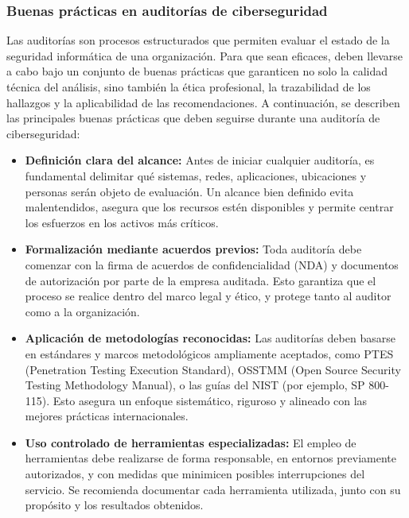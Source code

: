 \documentclass[a4paper, 10pt]{article}
\begin{document}
    \subsubsection{Buenas prácticas en auditorías de ciberseguridad}

    Las auditorías son procesos estructurados que permiten evaluar el estado de la seguridad informática de una organización. 
    Para que sean eficaces, deben llevarse a cabo bajo un conjunto de buenas prácticas que garanticen no solo la calidad técnica del análisis, sino también la ética profesional, 
    la trazabilidad de los hallazgos y la aplicabilidad de las recomendaciones. A continuación, se describen las principales buenas prácticas que deben seguirse durante una auditoría de ciberseguridad:
    
    \begin{itemize}
    
        \item \textbf{Definición clara del alcance:}  
        Antes de iniciar cualquier auditoría, es fundamental delimitar qué sistemas, redes, aplicaciones, ubicaciones y personas serán objeto de evaluación. Un alcance bien definido evita malentendidos, asegura que los recursos estén disponibles y permite centrar los esfuerzos en los activos más críticos.
    
        \item \textbf{Formalización mediante acuerdos previos:}  
        Toda auditoría debe comenzar con la firma de acuerdos de confidencialidad (NDA) y documentos de autorización por parte de la empresa auditada. Esto garantiza que el proceso se realice dentro del marco legal y ético, y protege tanto al auditor como a la organización.
    
        \item \textbf{Aplicación de metodologías reconocidas:}  
        Las auditorías deben basarse en estándares y marcos metodológicos ampliamente aceptados, como PTES (Penetration Testing Execution Standard), OSSTMM (Open Source Security Testing Methodology Manual), o las guías del NIST (por ejemplo, SP 800-115). Esto asegura un enfoque sistemático, riguroso y alineado con las mejores prácticas internacionales.
    
        \item \textbf{Uso controlado de herramientas especializadas:}  
        El empleo de herramientas debe realizarse de forma responsable, en entornos previamente autorizados, y con medidas que minimicen posibles interrupciones del servicio. Se recomienda documentar cada herramienta utilizada, junto con su propósito y los resultados obtenidos.
    

\end{itemize}
\end{document}
